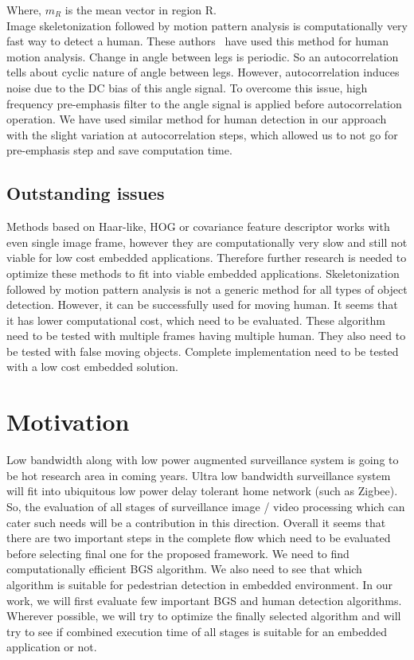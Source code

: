 Where, $m_R$ is the mean vector in region R.\\
\indent Image skeletonization followed by motion pattern analysis is
computationally very fast way to detect a human. These authors~\cite{32,
22, 31} have used this method for human motion analysis. Change in
angle between legs is periodic. So an autocorrelation tells about cyclic
nature of angle between legs. However, autocorrelation induces noise due
to the DC bias of this angle signal. To overcome this issue, high
frequency pre-emphasis filter to the angle signal is applied before
autocorrelation operation. We have used similar method for human
detection in our approach with the slight variation at autocorrelation
steps, which allowed us to not go for pre-emphasis step and save
computation time.
\subsection{Outstanding issues}
\indent Methods based on Haar-like, HOG or covariance feature descriptor
works with even single image frame, however they are computationally
very slow and still not viable for low cost embedded applications.
Therefore further research is needed to optimize these methods to fit
into viable embedded applications. Skeletonization followed by motion
pattern analysis is not a generic method for all types of object
detection. However, it can be successfully used for moving human. It
seems that it has lower computational cost, which need to be evaluated.
These algorithm need to be tested with multiple frames having multiple
human. They also need to be tested with false moving objects. Complete
implementation need to be tested with a low cost embedded solution.
\section{Motivation}
\indent Low bandwidth along with low power augmented surveillance system
is going to be hot research area in coming years. Ultra low bandwidth
surveillance system will fit into ubiquitous low power delay tolerant
home network (such as Zigbee). So, the evaluation of all stages of
surveillance image / video processing which can cater such needs will be
a contribution in this direction. Overall it seems that there are two
important steps in the complete flow which need to be evaluated before
selecting final one for the proposed framework. We need to find
computationally efficient BGS algorithm. We also need to see that which
algorithm is suitable for pedestrian detection in embedded environment.
In our work, we will first evaluate few important BGS and human
detection algorithms. Wherever possible, we will try to optimize
the finally selected algorithm and will try to see if combined execution
time of all stages is suitable for an embedded application or not.
